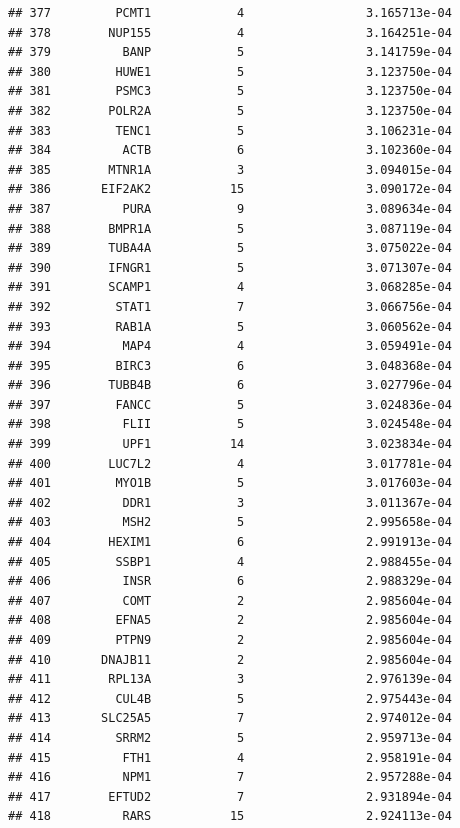 \documentclass[
]{article}
\begin{document}
\begin{verbatim}
## 377         PCMT1            4                 3.165713e-04
## 378        NUP155            4                 3.164251e-04
## 379          BANP            5                 3.141759e-04
## 380         HUWE1            5                 3.123750e-04
## 381         PSMC3            5                 3.123750e-04
## 382        POLR2A            5                 3.123750e-04
## 383         TENC1            5                 3.106231e-04
## 384          ACTB            6                 3.102360e-04
## 385        MTNR1A            3                 3.094015e-04
## 386       EIF2AK2           15                 3.090172e-04
## 387          PURA            9                 3.089634e-04
## 388        BMPR1A            5                 3.087119e-04
## 389        TUBA4A            5                 3.075022e-04
## 390        IFNGR1            5                 3.071307e-04
## 391        SCAMP1            4                 3.068285e-04
## 392         STAT1            7                 3.066756e-04
## 393         RAB1A            5                 3.060562e-04
## 394          MAP4            4                 3.059491e-04
## 395         BIRC3            6                 3.048368e-04
## 396        TUBB4B            6                 3.027796e-04
## 397         FANCC            5                 3.024836e-04
## 398          FLII            5                 3.024548e-04
## 399          UPF1           14                 3.023834e-04
## 400        LUC7L2            4                 3.017781e-04
## 401         MYO1B            5                 3.017603e-04
## 402          DDR1            3                 3.011367e-04
## 403          MSH2            5                 2.995658e-04
## 404        HEXIM1            6                 2.991913e-04
## 405         SSBP1            4                 2.988455e-04
## 406          INSR            6                 2.988329e-04
## 407          COMT            2                 2.985604e-04
## 408         EFNA5            2                 2.985604e-04
## 409         PTPN9            2                 2.985604e-04
## 410       DNAJB11            2                 2.985604e-04
## 411        RPL13A            3                 2.976139e-04
## 412         CUL4B            5                 2.975443e-04
## 413       SLC25A5            7                 2.974012e-04
## 414         SRRM2            5                 2.959713e-04
## 415          FTH1            4                 2.958191e-04
## 416          NPM1            7                 2.957288e-04
## 417        EFTUD2            7                 2.931894e-04
## 418          RARS           15                 2.924113e-04

\end{verbatim}
\end{document}
